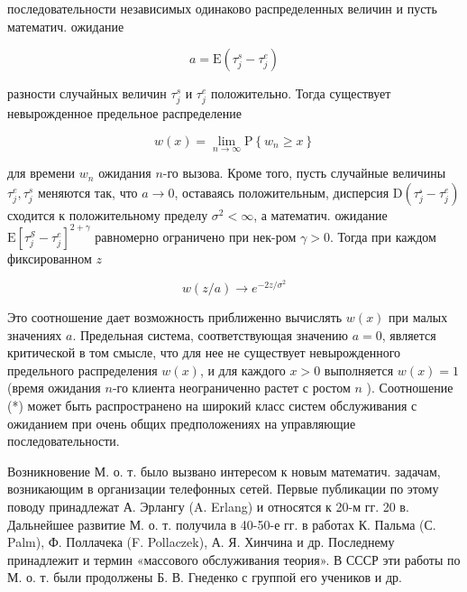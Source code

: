 \documentclass[10pt]{article}
\begin{document}
последовательности независимых одинаково распределенных величин и пусть математич. ожидание



\[

a=\mathrm{E}\left(\tau_{j}^{s}-\tau_{j}^{e}\right)

\]



разности случайных величин $\tau_{j}^{s}$ и $\tau_{j}^{e}$ положительно. Тогда существует невырожденное предельное распределение



\[

w(x)=\lim _{n \rightarrow \infty} \mathrm{P}\left\{w_{n} \geqslant x\right\}

\]



для времени $w_{n}$ ожидания $n$-го вызова. Кроме того, пусть случайные величины $\tau_{j}^{e}, \tau_{j}^{s}$ меняются так, что $a \rightarrow 0$, оставаясь положительным, дисперсия $\mathrm{D}\left(\tau_{j}^{\mathcal{s}}-\tau_{j}^{e}\right)$ сходится к положительному пределу $\sigma^{2}<\infty$, а математич. ожидание $\mathrm{E}\left[\tau_{j}^{\mathcal{S}}-\tau_{j}^{e}\right]^{2+\gamma}$ равномерно ограничено при нек-ром $\gamma>0$. Тогда при каждом фиксированном $z$



\[

w(z / a) \longrightarrow e^{-2 z / \sigma^{2}}

\]



Это соотношение дает возможность приближенно вычислять $w(x)$ при малых значениях $a$. Предельная система, соответствующая значению $a=0$, является критической в том смысле, что для нее не существует невырожденного предельного распределения $w(x)$, и для каждого $x>0$ выполняется $w(x)=1$ (время ожидания $n$-го клиента неограниченно растет с ростом $n$ ). Соотношение (*) может быть распространено на широкий класс систем обслуживания с ожиданием при очень общих предположениях на управляющие последовательности.



Возникновение М. о. т. было вызвано интересом к новым математич. задачам, возникающим в организации телефонных сетей. Первые публикации по этому поводу принадлежат А. Эрлангу (A. Erlang) и относятся к 20-м гг. 20 в. Дальнейшее развитие М. о. т. получила в 40-50-е гг. в работах К. Пальма (С. Palm), Ф. Поллачека (F. Pollaczek), А. Я. Хинчина и др. Последнему принадлежит и термин «массового обслуживания теория». В СССР эти работы по М. о. т. были продолжены Б. В. Гнеденко с группой его учеников и др.
\end{document}

